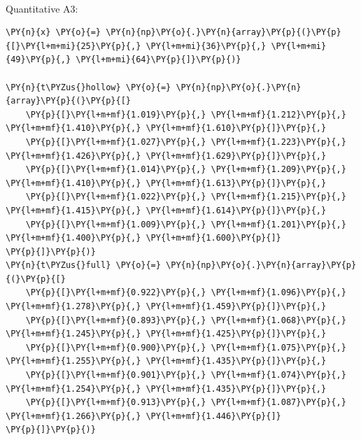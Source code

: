     \begin{center}
    \end{center}
    { \hspace*{\fill} \\}
    
    Quantitative A3:

    \begin{tcolorbox}[breakable, size=fbox, boxrule=1pt, pad at break*=1mm,colback=cellbackground, colframe=cellborder]
\begin{Verbatim}[commandchars=\\\{\}]
\PY{n}{x} \PY{o}{=} \PY{n}{np}\PY{o}{.}\PY{n}{array}\PY{p}{(}\PY{p}{[}\PY{l+m+mi}{25}\PY{p}{,} \PY{l+m+mi}{36}\PY{p}{,} \PY{l+m+mi}{49}\PY{p}{,} \PY{l+m+mi}{64}\PY{p}{]}\PY{p}{)}

\PY{n}{t\PYZus{}hollow} \PY{o}{=} \PY{n}{np}\PY{o}{.}\PY{n}{array}\PY{p}{(}\PY{p}{[}
    \PY{p}{[}\PY{l+m+mf}{1.019}\PY{p}{,} \PY{l+m+mf}{1.212}\PY{p}{,} \PY{l+m+mf}{1.410}\PY{p}{,} \PY{l+m+mf}{1.610}\PY{p}{]}\PY{p}{,}
    \PY{p}{[}\PY{l+m+mf}{1.027}\PY{p}{,} \PY{l+m+mf}{1.223}\PY{p}{,} \PY{l+m+mf}{1.426}\PY{p}{,} \PY{l+m+mf}{1.629}\PY{p}{]}\PY{p}{,}
    \PY{p}{[}\PY{l+m+mf}{1.014}\PY{p}{,} \PY{l+m+mf}{1.209}\PY{p}{,} \PY{l+m+mf}{1.410}\PY{p}{,} \PY{l+m+mf}{1.613}\PY{p}{]}\PY{p}{,}
    \PY{p}{[}\PY{l+m+mf}{1.022}\PY{p}{,} \PY{l+m+mf}{1.215}\PY{p}{,} \PY{l+m+mf}{1.415}\PY{p}{,} \PY{l+m+mf}{1.614}\PY{p}{]}\PY{p}{,}
    \PY{p}{[}\PY{l+m+mf}{1.009}\PY{p}{,} \PY{l+m+mf}{1.201}\PY{p}{,} \PY{l+m+mf}{1.400}\PY{p}{,} \PY{l+m+mf}{1.600}\PY{p}{]}
\PY{p}{]}\PY{p}{)}
\PY{n}{t\PYZus{}full} \PY{o}{=} \PY{n}{np}\PY{o}{.}\PY{n}{array}\PY{p}{(}\PY{p}{[}
    \PY{p}{[}\PY{l+m+mf}{0.922}\PY{p}{,} \PY{l+m+mf}{1.096}\PY{p}{,} \PY{l+m+mf}{1.278}\PY{p}{,} \PY{l+m+mf}{1.459}\PY{p}{]}\PY{p}{,}
    \PY{p}{[}\PY{l+m+mf}{0.893}\PY{p}{,} \PY{l+m+mf}{1.068}\PY{p}{,} \PY{l+m+mf}{1.245}\PY{p}{,} \PY{l+m+mf}{1.425}\PY{p}{]}\PY{p}{,}
    \PY{p}{[}\PY{l+m+mf}{0.900}\PY{p}{,} \PY{l+m+mf}{1.075}\PY{p}{,} \PY{l+m+mf}{1.255}\PY{p}{,} \PY{l+m+mf}{1.435}\PY{p}{]}\PY{p}{,}
    \PY{p}{[}\PY{l+m+mf}{0.901}\PY{p}{,} \PY{l+m+mf}{1.074}\PY{p}{,} \PY{l+m+mf}{1.254}\PY{p}{,} \PY{l+m+mf}{1.435}\PY{p}{]}\PY{p}{,}
    \PY{p}{[}\PY{l+m+mf}{0.913}\PY{p}{,} \PY{l+m+mf}{1.087}\PY{p}{,} \PY{l+m+mf}{1.266}\PY{p}{,} \PY{l+m+mf}{1.446}\PY{p}{]}
\PY{p}{]}\PY{p}{)}


\end{Verbatim}
\end{tcolorbox}
